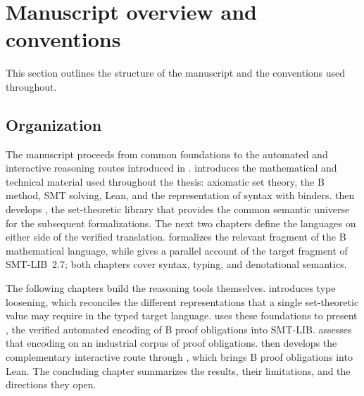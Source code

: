 \newcommand{\overviewcolorbox}[3]{%
  \tikz[baseline=(label.base)]{
    \node[
      fill=#1,
      draw=#1!75!cover-cream,
      line width=1pt,
      text=#2,
      font=\small\sffamily\bfseries,
      minimum width=18mm,
      minimum height=1.7em,
      inner xsep=4pt,
      inner ysep=1.5pt,
      outer sep=2pt,
      rounded corners=3pt
    ] (label) {#3};
  }%
}

\section{Manuscript overview and conventions}
\label{sec:manuscript-overview}

This section outlines the structure of the manuscript and the conventions used
throughout.

\subsection{Organization}
The manuscript proceeds from common foundations to the automated and
interactive reasoning routes introduced in .
 introduces the mathematical and technical material used
throughout the thesis: axiomatic set theory, the B method, SMT solving, Lean,
and the representation of syntax with binders.  then develops
\zflean, the set-theoretic library that provides the common semantic universe
for the subsequent formalizations. The next two chapters define the languages
on either side of the verified translation.  formalizes the relevant
fragment of the B mathematical language, while  gives a parallel
account of the target fragment of SMT-LIB~2.7; both chapters cover syntax,
typing, and denotational semantics.

The following chapters build the reasoning tools themselves.
 introduces type loosening, which reconciles the different
representations that a single set-theoretic value may require in the typed
target language.  uses these foundations to present \beer, the
verified automated encoding of B proof obligations into SMT-LIB.
 assesses that encoding on an industrial corpus of proof
obligations.  then develops the complementary interactive route
through \barrel, which brings B proof obligations into Lean. The concluding chapter summarizes the results,
their limitations, and the directions they open.

